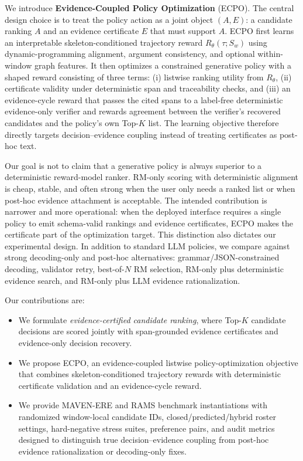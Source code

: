 \documentclass{article}
\newcommand{\ECPO}{\textsc{ECPO}}
\begin{document}
We introduce \textbf{Evidence-Coupled Policy Optimization} (\ECPO). The central design choice is to treat the policy action as a joint object $(A,E)$: a candidate ranking $A$ and an evidence certificate $E$ that must support $A$. \ECPO{} first learns an interpretable skeleton-conditioned trajectory reward $R_\theta(\tau;S_w)$ using dynamic-programming alignment, argument consistency, and optional within-window graph features. It then optimizes a constrained generative policy with a shaped reward consisting of three terms: (i) listwise ranking utility from $R_\theta$, (ii) certificate validity under deterministic span and traceability checks, and (iii) an evidence-cycle reward that passes the cited spans to a label-free deterministic evidence-only verifier and rewards agreement between the verifier's recovered candidates and the policy's own Top-$K$ list. The learning objective therefore directly targets decision--evidence coupling instead of treating certificates as post-hoc text.

Our goal is not to claim that a generative policy is always superior to a deterministic reward-model ranker. RM-only scoring with deterministic alignment is cheap, stable, and often strong when the user only needs a ranked list or when post-hoc evidence attachment is acceptable. The intended contribution is narrower and more operational: when the deployed interface requires a single policy to emit schema-valid rankings and evidence certificates, ECPO makes the certificate part of the optimization target. This distinction also dictates our experimental design. In addition to standard LLM policies, we compare against strong decoding-only and post-hoc alternatives: grammar/JSON-constrained decoding, validator retry, best-of-$N$ RM selection, RM-only plus deterministic evidence search, and RM-only plus LLM evidence rationalization.

Our contributions are:
\begin{itemize}
    \item We formulate \emph{evidence-certified candidate ranking}, where Top-$K$ candidate decisions are scored jointly with span-grounded evidence certificates and evidence-only decision recovery.
    \item We propose \ECPO, an evidence-coupled listwise policy-optimization objective that combines skeleton-conditioned trajectory rewards with deterministic certificate validation and an evidence-cycle reward.
    \item We provide MAVEN-ERE and RAMS benchmark instantiations with randomized window-local candidate IDs, closed/predicted/hybrid roster settings, hard-negative stress suites, preference pairs, and audit metrics designed to distinguish true decision--evidence coupling from post-hoc evidence rationalization or decoding-only fixes.
\end{itemize}
\end{document}
